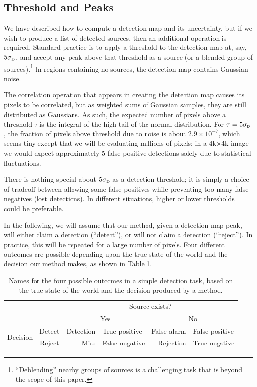 \documentclass[11pt,letterpaper,linenumbers]{aastex63}
\newcommand{\sigd}{\sigma_{\mbox{\rmfamily\tiny D}}}
\newcommand\tstrut{\rule[-0.5ex]{0pt}{3ex}}
\begin{document}
\subsection{Threshold and Peaks}

We have described how to compute a detection map and its uncertainty,
but if we wish to produce a list of detected sources, then an
additional operation is required.  Standard practice is to apply a
threshold to the detection map at, say, $5 \sigd$, and accept any
peak above that threshold as a source (or a blended group of
sources).\footnote{``Deblending'' nearby groups of sources is a
  challenging task that is beyond the scope of this paper.}  In
regions containing no sources, the detection map contains Gaussian
noise.


The correlation operation that appears in creating the detection map
causes its pixels to be correlated, but as weighted sums of Gaussian
samples, they are still distributed as Gaussians.  As such, the
expected number of pixels above a threshold $\tau$ is the integral of
the high tail of the normal distribution.  For $\tau = 5 \sigd$,
the fraction of pixels above threshold due to noise is about
$2.9\times10^{-7}$, which seems tiny except that we will be evaluating
millions of pixels; in a 4k$\times$4k image we would expect
approximately $5$ false positive detections solely due to statistical
fluctuations.


There is nothing special about $5 \sigd$ as a detection threshold; it
is simply a choice of tradeoff between allowing some false positives
while preventing too many false negatives (lost detections).  In
different situations, higher or lower thresholds could be preferable.


In the following, we will assume that our method, given a
detection-map peak, will either claim a detection (``detect''), or will not claim a detection (``reject'').
In practice, this will be repeated for a large number of pixels.  Four
different outcomes are possible depending upon the true state of the
world and the decision our method makes, as shown in
Table \ref{tab:outcomes}.

\begin{table}[h!]
\begin{center}
\begin{tabular}{|c|c|r@{ / }l|r@{ / }l|}
  \cline{3-6}
  \multicolumn{2}{c|}{} & \multicolumn{4}{c|}{Source exists? \tstrut} \\
  \cline{3-6}
  \multicolumn{2}{c|}{} & \multicolumn{2}{c|}{Yes} & \multicolumn{2}{c|}{No} \tstrut \\
  \hline
  \multirow{2}{*}{Decision} & Detect &
  Detection & True positive   &
  False alarm & False positive \tstrut \\
  \cline{2-6}
  & Reject &
  Miss & False negative &
  Rejection & True negative \tstrut \\
  \hline
\end{tabular}
\end{center}
\caption{Names for the four possible outcomes in a simple detection task,
  based on the true state of the world and the decision produced by a
  method.  \label{tab:outcomes}}
\end{table}
\end{document}
